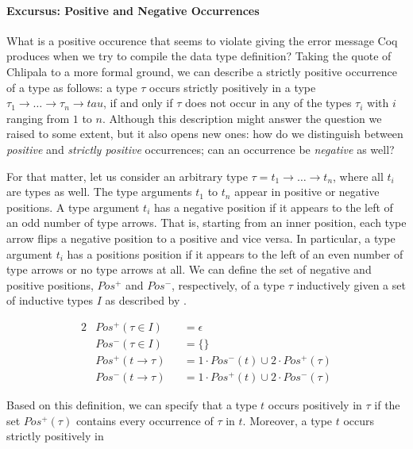 \begin{excursus}
\paragraph{Excursus: Positive and Negative Occurrences}
What is a positive occurence that  seems to violate giving
the error message Coq produces when we try to compile the data type
definition?
Taking the quote of Chlipala to a more formal ground, we can describe
a strictly positive occurrence of a type as follows: a type $\tau$
occurs strictly positively in a type $\tau_1\rightarrow \dots
\rightarrow \tau_n \rightarrow tau$, if and only if $\tau$ does not
occur in any of the types $\tau_i$ with $i$ ranging from $1$ to $n$.
Although this description might answer the question we raised to some
extent, but it also opens new ones: how do we distinguish between
\emph{positive} and \emph{strictly positive} occurrences; can an
occurrence be \emph{negative} as well?

For that matter, let us consider an arbitrary type $\tau = t_1
\rightarrow \dots \rightarrow t_n$, where all $t_i$ are types as well.
The type arguments $t_1$ to $t_n$ appear in positive or negative
positions.
A type argument $t_i$ has a negative position if it appears to the
left of an odd number of type arrows.
That is, starting from an inner position, each type arrow flips a
negative position to a positive and vice versa.
In particular, a type argument $t_i$ has a positions position if it
appears to the left of an even number of type arrows or no type arrows
at all.
We can define the set of negative and positive positions, $Pos^{+}$
and $Pos^{-}$, respectively, of a type $\tau$ inductively given a set of
inductive types $I$ as described by
\citet{blanqui2002inductivedatatype}.

\begin{alignat*}{2}
  &Pos^{+} (\tau \in I) &&= \epsilon\\
  &Pos^{-} (\tau \in I) &&= \{\}\\
  &Pos^{+} (t \rightarrow \tau) &&= 1 \cdot Pos^{-} (t) \cup 2 \cdot Pos^{+} (\tau)\\
  &Pos^{-} (t \rightarrow \tau) &&= 1 \cdot Pos^{+} (t) \cup 2 \cdot Pos^{-} (\tau)
\end{alignat*}

Based on this definition, we can specify that a type $t$ occurs
positively in $\tau$ if the set $Pos^{+} (\tau)$ contains every occurrence of $\tau$ in
$t$.
Moreover, a type $t$ occurs strictly positively in


\end{excursus}
